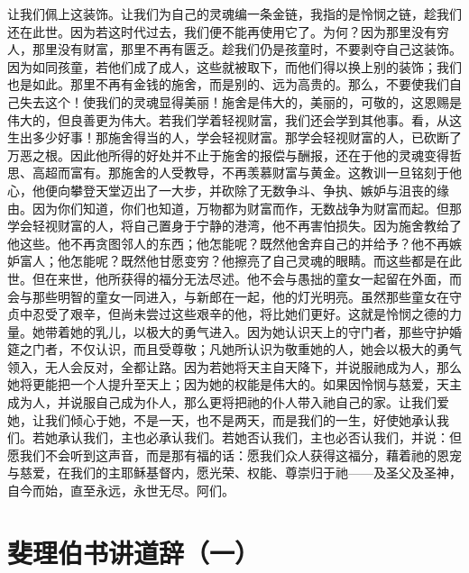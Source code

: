 让我们佩上这装饰。让我们为自己的灵魂编一条金链，我指的是怜悯之链，趁我们还在此世。因为若这时代过去，我们便不能再使用它了。为何？因为那里没有穷人，那里没有财富，那里不再有匮乏。趁我们仍是孩童时，不要剥夺自己这装饰。因为如同孩童，若他们成了成人，这些就被取下，而他们得以换上别的装饰；我们也是如此。那里不再有金钱的施舍，而是别的、远为高贵的。那么，不要使我们自己失去这个！使我们的灵魂显得美丽！施舍是伟大的，美丽的，可敬的，这恩赐是伟大的，但良善更为伟大。若我们学着轻视财富，我们还会学到其他事。看，从这生出多少好事！那施舍得当的人，学会轻视财富。那学会轻视财富的人，已砍断了万恶之根。因此他所得的好处并不止于施舍的报偿与酬报，还在于他的灵魂变得哲思、高超而富有。那施舍的人受教导，不再羡慕财富与黄金。这教训一旦铭刻于他心，他便向攀登天堂迈出了一大步，并砍除了无数争斗、争执、嫉妒与沮丧的缘由。因为你们知道，你们也知道，万物都为财富而作，无数战争为财富而起。但那学会轻视财富的人，将自己置身于宁静的港湾，他不再害怕损失。因为施舍教给了他这些。他不再贪图邻人的东西；他怎能呢？既然他舍弃自己的并给予？他不再嫉妒富人；他怎能呢？既然他甘愿变穷？他擦亮了自己灵魂的眼睛。而这些都是在此世。但在来世，他所获得的福分无法尽述。他不会与愚拙的童女一起留在外面，而会与那些明智的童女一同进入，与新郎在一起，他的灯光明亮。虽然那些童女在守贞中忍受了艰辛，但尚未尝过这些艰辛的他，将比她们更好。这就是怜悯之德的力量。她带着她的乳儿，以极大的勇气进入。因为她认识天上的守门者，那些守护婚筵之门者，不仅认识，而且受尊敬；凡她所认识为敬重她的人，她会以极大的勇气领入，无人会反对，全都让路。因为若她将天主自天降下，并说服祂成为人，那么她将更能把一个人提升至天上；因为她的权能是伟大的。如果因怜悯与慈爱，天主成为人，并说服自己成为仆人，那么更将把祂的仆人带入祂自己的家。让我们爱她，让我们倾心于她，不是一天，也不是两天，而是我们的一生，好使她承认我们。若她承认我们，主也必承认我们。若她否认我们，主也必否认我们，并说：但愿我们不会听到这声音，而是那有福的话：愿我们众人获得这福分，藉着祂的恩宠与慈爱，在我们的主耶稣基督内，愿光荣、权能、尊崇归于祂——及圣父及圣神，自今而始，直至永远，永世无尽。阿们。\par



\section{斐理伯书讲道辞（一）}

